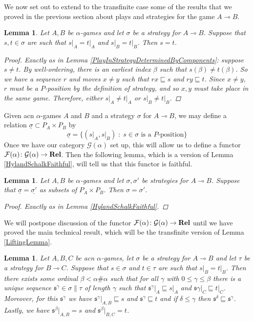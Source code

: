 \documentclass[11pt]{article} %
\theoremstyle{plain} %
\newtheorem{lemma}[theorem]{Lemma}
\theoremstyle{definition} %
\theoremstyle{note}
\theoremstyle{exercisestyle}
\newcommand{\catname}[1]{{\normalfont\textbf{#1}}}
\newcommand{\Rel}{\catname{Rel}}
\newcommand*\from{\colon}
\newcommand{\cmap}[3]{#1\from{}#2\to{}#3}
\renewcommand{\implies}{\multimap}
\newcommand{\G}{\mathcal G}
\newcommand{\suchthat}{\;\colon\;}
\newcommand{\F}{\mathcal F}
\newcommand{\s}{\mathfrak s}
\newcommand{\prefix}{\sqsubseteq}
\newcommand{\grel}[1]{\underline{#1}}
\begin{document}
We now set out to extend to the transfinite case some of the results that we proved in the previous section about plays and strategies for the game $A\implies B$.

\begin{lemma}
  \label{TransPlayInStrategyDeterminedByComponents}
  Let $A,B$ be $\alpha$-games and let $\sigma$ be a strategy for $A\implies B$.  Suppose that $s,t\in\sigma$ are such that $s\vert_A=t\vert_A$ and $s\vert_B=t\vert_B$.  Then $s=t$.
  \begin{proof}
    Exactly as in Lemma \ref{PlayInStrategyDeterminedByComponents}: suppose $s\ne t$.  By well-ordering, there is an earliest index $\beta$ such that $s(\beta)\ne t(\beta)$.  So we have a sequence $r$ and moves $x\ne y$ such that $rx\prefix s$ and $ry\prefix t$.  Since $x\ne y$, $r$ must be a $P$-position by the definition of strategy, and so $x,y$ must take place in the same game.  Therefore, either $s\vert_A\ne t\vert_A$ or $s\vert_B\ne t\vert_B$.
  \end{proof}
\end{lemma}

Given acn $\alpha$-games $A$ and $B$ and a strategy $\sigma$ for $A\implies B$, we may define a relation $\grel\sigma\subset P_A\times P_B$ by
\[
  \grel\sigma = \{(s\vert_A,s\vert_B)\suchthat\textrm{$s\in\sigma$ is a $P$-position}\}
  \]
Once we have our category $\G(\alpha)$ set up, this will allow us to define a functor $\cmap{\F(\alpha)}{\G(\alpha)}{\Rel}$.  Then the following lemma, which is a version of Lemma \ref{HylandSchalkFaithful}, will tell us that this functor is faithful.

\begin{lemma}
  \label{TransHylandSchalkFaithful}
  Let $A,B$ be $\alpha$-games and let $\sigma,\sigma'$ be strategies for $A\implies B$.  Suppose that $\grel\sigma=\grel{\sigma'}$ as subsets of $P_A\times P_B$.  Then $\sigma=\sigma'$.
  \begin{proof}
    Exactly as in Lemma \ref{HylandSchalkFaithful}.
  \end{proof}
\end{lemma}

We will postpone discussion of the functor $\cmap{\F(\alpha)}{\G(\alpha)}{\Rel}$ until we have proved the main technical result, which will be the transfinite version of Lemma \ref{LiftingLemma}.  

\begin{lemma}
  \label{TransLiftingLemma}
  Let $A,B,C$ be acn $\alpha$-games, let $\sigma$ be a strategy for $A\implies B$ and let $\tau$ be a strategy for $B\implies C$.  Suppose that $s\in\sigma$ and $t\in\tau$ are such that $s\vert_B=t\vert_B$.  Then there exists some ordinal $\beta<\alpha\#\alpha$ such that for all $\gamma$ with $0\le\gamma\le\beta$ there is a unique sequence $\s^\gamma\in\sigma\|\tau$ of length $\gamma$ such that $\s^\gamma\vert_A\prefix s\vert_A$ and $\s\gamma\vert_C\prefix t\vert_C$.  Moreover, for this $\s^\gamma$ we have $\s^\gamma\vert_{A,B}\prefix s$ and $\s^\gamma\prefix t$ and if $\delta\le\gamma$ then $\s^\delta\prefix\s^\gamma$.  Lastly, we have $\s^\beta\vert_{A,B}=s$ and $\s^\beta\vert_{B,C}=t$.
\end{lemma}
\end{document}
